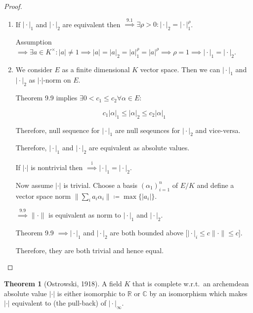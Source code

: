 \documentclass[openany]{amsbook}
\numberwithin{section}{chapter}
\theoremstyle{definition}
\newtheorem{theorem}{Theorem}[chapter]
\begin{document}
\begin{proof}
    \begin{enumerate}[label=\roman*)]
        \item If \(\vert \cdot \vert _1\) and \(\vert \cdot \vert _2\) are equivalent then \(\overset{9.1}{\implies} \exists \rho > 0 : \vert \cdot \vert _2 = \vert \cdot \vert _1 ^ \rho\).
        
        Assumption \(\implies \exists a\in K^\times : \vert a \vert \neq 1 \implies \vert a \vert = \vert a \vert _2 = \vert a \vert _1^{\rho} = \vert a \vert ^ \rho \implies \rho =1 \implies \vert \cdot \vert _1 = \vert \cdot \vert _2\).
        
        \item We consider \(E\) as a finite dimensional \(K\) vector space. Then we can \(\vert \cdot \vert _1\) and \(\vert \cdot \vert _2\) as \(\vert \cdot \vert\)-norm on \(E\).
        
        Theorem 9.9 implies \(\exists 0 < c_1 \leq c_2 \forall \alpha \in E:\)

        \[
            c_1 \vert \alpha \vert _1 \leq \vert \alpha  \vert_2 \leq c_2 \vert \alpha \vert _1
        \]

        Therefore, null sequence for \(\vert \cdot \vert _1\) are null seqeunces for \(\vert \cdot \vert _2\) and vice-versa.

        Therefore, \(\vert \cdot \vert _1\) and \(\vert \cdot \vert _2\) are equivalent as absolute values.

        If \(\vert \cdot \vert\) is nontrivial then \(\overset{\text{i}}{\implies} \vert \cdot \vert _1 = \vert \cdot \vert _2\).

        Now assume \(\vert \cdot \vert\) is trivial. Choose a basis \((\alpha_1)_{i=1}^n\) of \(E / K\) and define a vector space norm \(\lVert \sum_{i} a_i \alpha_i \rVert \coloneqq \max \{ \vert a_i \vert \} \).
        
        \(\overset{9.9}{\implies} \lVert \cdot \rVert\) is equivalent as norm to \(\vert \cdot \vert _1\) and \(\vert \cdot \vert _2\).

        Theorem 9.9 \(\implies \vert \cdot \vert _1\) and \(\vert \cdot \vert _2\) are both bounded above [\(\vert \cdot \vert_i \leq c\lVert \cdot \rVert \leq c\)].

        Therefore, they are both trivial and hence equal.
    \end{enumerate} 
\end{proof}

\begin{theorem}
    [Ostrowski, 1918] A field \(K\) that is complete w.r.t.\ an archemdean absolute value \(\vert \cdot \vert\) is either isomorphic to \(\mathbb{R}\) or \(\mathbb{C}\) by an isomorphism which makes \(\vert \cdot \vert\) equivalent to (the pull-back) of \(\vert \cdot \vert _\infty\).
\end{theorem}
\end{document}
